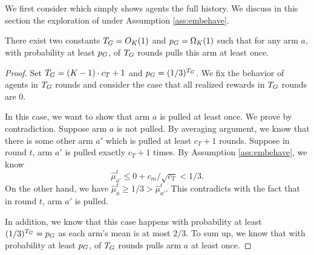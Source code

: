 \section{\ALGG}
We first consider \ALGG which simply shows agents the full history. We discuss in this section the exploration of \ALGG under Assumption \ref{ass:embehave}.

\begin{lemma}
\label{lem:greedy}
There exist two constants $T_G = O_K(1)$ and $p_G = \Omega_K(1)$ such that for any arm $a$, with probability at least $p_G$, \ALGG of $T_G$ rounds pulls this arm at least once. 
\end{lemma}

\begin{proof}
Set $T_G = (K-1) \cdot c_T + 1$ and $p_G = (1/3)^{T_G}$. We fix the behavior of agents in $T_G$ rounds and consider the case that all realized rewards in $T_G$ rounds are 0. 

In this case, we want to show that arm $a$ is pulled at least once. We prove by contradiction. Suppose arm $a$ is not pulled. By averaging argument, we know that there is some other arm $a'$ which is pulled at least $c_T + 1$ rounds. Suppose in round $t$, arm $a'$ is pulled exactly $c_T + 1$ times. By Assumption \ref{ass:embehave}, we know 
\[
\hat{\mu}_{a'}^t \leq 0 + c_m / \sqrt{c_T} < 1/3. 
\]
On the other hand, we have $\hat{\mu}_a^t \geq 1/3 > \hat{\mu}_{a'}^t$. This contradicts with the fact that in round $t$, arm $a'$ is pulled. 

In addition, we know that this case happens with probability at least $(1/3)^{T_G} = p_G$ as each arm's mean is at most $2/3$. To sum up, we know that with probability at least $p_G$, \ALGG of $T_G$ rounds pulls arm $a$ at least once. 
\end{proof}